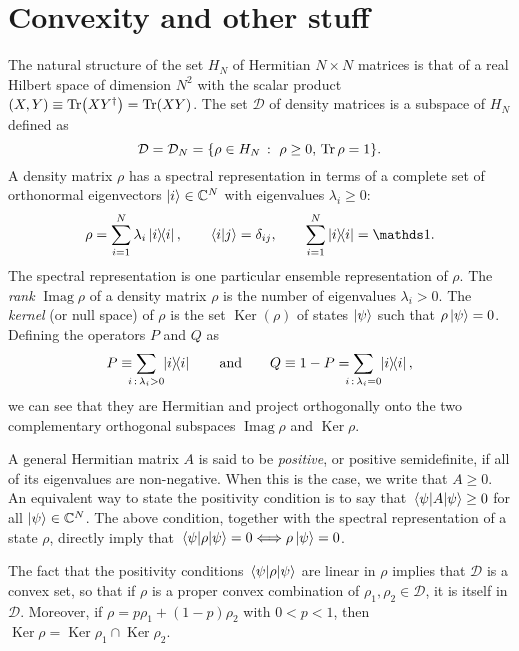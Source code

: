 \documentclass[a4paper]{report}
\DeclareMathOperator{\Ker}{Ker}
\DeclareMathOperator{\Imag}{Imag}
\begin{document}
\section{Convexity and other stuff}
The natural structure of the set $H_N$ of Hermitian $N\times N$ matrices is that of a real Hilbert space of dimension $N^2$ with the scalar product
$(X, Y) \equiv \Tr(XY^\dagger) = \Tr(XY)$.
The set $\mathcal D$ of density matrices is a subspace of $H_N$ defined as
\begin{equation}
	\mathcal D = \mathcal D_N = \{ \rho \in H_N \,:\,\, \rho \ge 0, \,\Tr\rho=1 \}.
\end{equation}
A density matrix $\rho$ has a spectral representation in terms of a complete set of orthonormal eigenvectors $\ket i \in \mathbb C^N$ with eigenvalues $\lambda_i \ge 0$:
\begin{equation}
	\rho = \sum_{i=1}^N \lambda_i \ketbra{i}{i},
	\qquad
	\braket{i}{j} = \delta_{ij},
	\qquad
	\sum_{i=1}^N \ketbra{i}{i} = \mathds1.
\end{equation}
The spectral representation is one particular ensemble representation of $\rho$.
The \emph{rank} $\Imag\rho$ of a density matrix $\rho$ is the number of eigenvalues $\lambda_i > 0$.
The \emph{kernel} (or null space) of $\rho$ is the set $\Ker(\rho)$ of states $\ket\psi$ such that $\rho\ket\psi = 0$.
Defining the operators $P$ and $Q$ as
\begin{equation}
	P \equiv \sum_{\mathclap{i\,:\,\lambda_i > 0}}\,\, \ketbra{i}{i}
	\qquad\text{and}\qquad
	Q \equiv 1 - P = \sum_{\mathclap{i\,:\,\lambda_i=0}}\,\, \ketbra{i}{i},
\end{equation}
we can see that they are Hermitian and project orthogonally onto the two complementary orthogonal subspaces $\Imag\rho$ and $\Ker\rho$.

A general Hermitian matrix $A$ is said to be \emph{positive}, or positive semidefinite,
if all of its eigenvalues are non-negative.
When this is the case, we write that $A\ge0$.
An equivalent way to state the positivity condition is to say that
$\mel{\psi}{A}{\psi} \ge 0$ for all $\ket\psi\in \mathbb C^N$.
The above condition, together with the spectral representation of a state $\rho$,
directly imply that $\mel{\psi}{\rho}{\psi} = 0 \Longleftrightarrow \rho\ket\psi=0$.

The fact that the positivity conditions $\mel\psi\rho\psi$ are linear in $\rho$ implies that $\mathcal D$ is a convex set, so that if $\rho$ is a proper convex combination of $\rho_1, \rho_2\in \mathcal D$, it is itself in $\mathcal D$.
Moreover, if $\rho=p \rho_1 + (1-p)\rho_2$ with $0<p<1$, then
$\Ker\rho = \Ker\rho_1 \cap \Ker\rho_2$.
\end{document}
